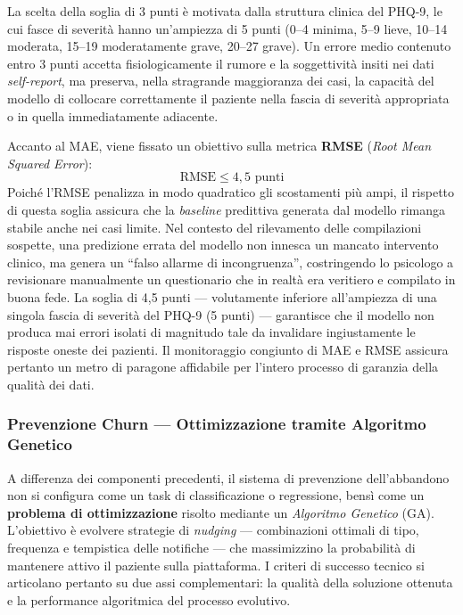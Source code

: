La scelta della soglia di 3 punti è motivata dalla struttura clinica del PHQ-9, le cui fasce di severità hanno un'ampiezza di 5 punti (0--4 minima, 5--9 lieve, 10--14 moderata, 15--19 moderatamente grave, 20--27 grave). Un errore medio contenuto entro 3 punti accetta fisiologicamente il rumore e la soggettività insiti nei dati \textit{self-report}, ma preserva, nella stragrande maggioranza dei casi, la capacità del modello di collocare correttamente il paziente nella fascia di severità appropriata o in quella immediatamente adiacente.

Accanto al MAE, viene fissato un obiettivo sulla metrica \textbf{RMSE} (\textit{Root Mean Squared Error}):
\[
    \text{RMSE} \leq 4{,}5 \text{ punti}
\]
Poiché l'RMSE penalizza in modo quadratico gli scostamenti più ampi, il rispetto di questa soglia assicura che la \textit{baseline} predittiva generata dal modello rimanga stabile anche nei casi limite. Nel contesto del rilevamento delle compilazioni sospette, una predizione errata del modello non innesca un mancato intervento clinico, ma genera un ``falso allarme di incongruenza'', costringendo lo psicologo a revisionare manualmente un questionario che in realtà era veritiero e compilato in buona fede. La soglia di 4,5 punti --- volutamente inferiore all'ampiezza di una singola fascia di severità del PHQ-9 (5 punti) --- garantisce che il modello non produca mai errori isolati di magnitudo tale da invalidare ingiustamente le risposte oneste dei pazienti. Il monitoraggio congiunto di MAE e RMSE assicura pertanto un metro di paragone affidabile per l'intero processo di garanzia della qualità dei dati.

\subsubsection{Prevenzione Churn --- Ottimizzazione tramite Algoritmo Genetico}
\label{subsubsec:metriche_churn}

A differenza dei componenti precedenti, il sistema di prevenzione dell'abbandono non si configura come un task di classificazione o regressione, bensì come un \textbf{problema di ottimizzazione} risolto mediante un \textit{Algoritmo Genetico} (GA). L'obiettivo è evolvere strategie di \textit{nudging} --- combinazioni ottimali di tipo, frequenza e tempistica delle notifiche --- che massimizzino la probabilità di mantenere attivo il paziente sulla piattaforma. I criteri di successo tecnico si articolano pertanto su due assi complementari: la qualità della soluzione ottenuta e la performance algoritmica del processo evolutivo.

